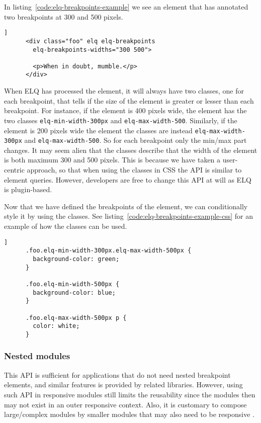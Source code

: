 \documentclass{acm_proc_article-sp}
\newcommand{\code}[1]{\texttt{#1}}
\newcommand{\elq}{ELQ}
\begin{document}
    In listing~\ref{code:elq-breakpoints-example} we see an element that has annotated two breakpoints at 300 and 500 pixels.

    \begin{lstlisting}[gobble=6,caption={},captionpos=b,label={code:elq-breakpoints-example}]]
      <div class="foo" elq elq-breakpoints
        elq-breakpoints-widths="300 500">
        
        <p>When in doubt, mumble.</p>
      </div>
    \end{lstlisting}

    When \elq{} has processed the element, it will always have two classes, one for each breakpoint, that tells if the size of the element is greater or lesser than each breakpoint.
    For instance, if the element is 400 pixels wide, the element has the two classes \code{elq-min-width-300px} and \code{elq-max-width-500}.
    Similarly, if the element is 200 pixels wide the element the classes are instead \code{elq-max-width-300px} and \code{elq-max-width-500}.
    So for each breakpoint only the min/max part changes.
    It may seem alien that the classes describe that the width of the element is both maximum 300 and 500 pixels.
    This is because we have taken a user-centric approach, so that when using the classes in CSS the API is similar to element queries.
    However, developers are free to change this API at will as \elq{} is plugin-based.

    Now that we have defined the breakpoints of the element, we can conditionally style it by using the classes.
    See listing~\ref{code:elq-breakpoints-example-css} for an example of how the classes can be used.

    \begin{lstlisting}[gobble=6,caption={},captionpos=b,label={code:elq-breakpoints-example-css}]]
      .foo.elq-min-width-300px.elq-max-width-500px {
        background-color: green;
      }

      .foo.elq-min-width-500px {
        background-color: blue;
      }

      .foo.elq-max-width-500px p {
        color: white;
      }
    \end{lstlisting}

    \subsubsection{Nested modules}
      This API is sufficient for applications that do not need nested breakpoint elements, and similar features is provided by related libraries.
      However, using such API in responsive modules still limits the reusability since the modules then may not exist in an outer responsive context.
      Also, it is customary to compose large/complex modules by smaller modules that may also need to be responsive \cite{parnas1972criteria}.
\end{document}
